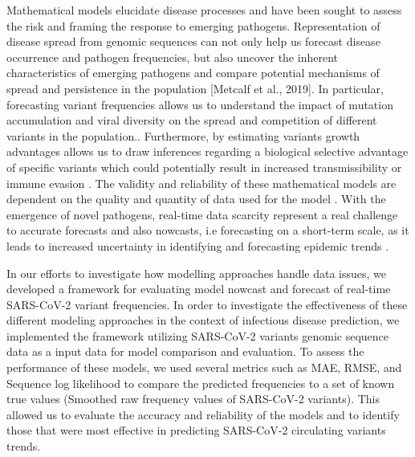 \documentclass[11pt,oneside,letterpaper]{article}
\begin{document}
Mathematical models elucidate disease processes and have been sought to assess the risk and framing the response to emerging pathogens. 
Representation of disease spread from genomic sequences can not only help us forecast disease occurrence and pathogen frequencies, but also uncover the inherent characteristics of emerging pathogens and compare potential mechanisms of spread and persistence in the population [Metcalf et al., 2019].
In particular, forecasting variant frequencies allows us to understand the impact of mutation accumulation and viral diversity on the spread and competition of different variants in the population.. 
Furthermore, by estimating variants growth advantages allows us to draw inferences regarding a biological selective advantage of specific variants which could potentially result in increased transmissibility or immune evasion \cite{tegally_detection_2021}. 
The validity and reliability of these mathematical models are dependent on the quality and quantity of data used for the model \cite{tao_biological_2021}.
With the emergence of novel pathogens, real-time data scarcity represent a real challenge to accurate forecasts and also nowcasts, i.e forecasting on a short-term scale, as it leads to 
increased uncertainty in identifying and forecasting epidemic trends \cite{metcalf_opportunities_2017}.


In our efforts to investigate how modelling approaches handle data issues, we developed a framework for evaluating model nowcast and forecast of real-time SARS-CoV-2 variant frequencies.
In order to investigate the effectiveness of these different modeling approaches in the context of infectious disease prediction, we implemented the framework utilizing SARS-CoV-2 variants genomic sequence data as a input data for model comparison and evaluation.
To assess the performance of these models, we used several metrics such as MAE, RMSE, and Sequence log likelihood to compare the predicted frequencies to a set of known true values (Smoothed raw frequency values of SARS-CoV-2 variants). %
This allowed us to evaluate the accuracy and reliability of the models and to identify those that were most effective in predicting SARS-CoV-2 circulating variants trends.
\end{document}
